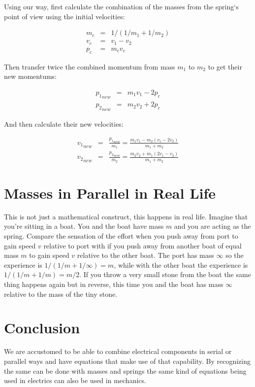 Using our way, first calculate the combination of the masses from the spring`s point of view using the initial velocities:

\begin{eqnarray}
m_c &=& 1/(1/m_1 + 1/m_2) \\
v_c &=& v_1 - v_2 \\
p_c &=& m_c v_c
\end{eqnarray}

Then transfer twice the combined momentum from mass $m_1$ to $m_2$ to get their new momentums:

\begin{eqnarray}
{p_1}_{new} &=& m_1 v_1 - 2 p_c \\
{p_2}_{new} &=& m_2 v_2 + 2 p_c
\end{eqnarray}

And then calculate their new velocities:

\begin{eqnarray}
{v_1}_{new} &=& \frac{{p_1}_{new}}{m_1} = \frac{m_1 v_1 - m_2(v_1 - 2 v_2)}{m_1 + m_2} \\
{v_2}_{new} &=& \frac{{p_2}_{new}}{m_2} = \frac{m_2 v_2 + m_1(2 v_1 - v_2)}{m_1 + m_2}
\end{eqnarray}

\section{Masses in Parallel in Real Life}

This is not just a mathematical construct, this happens in real life.
Imagine that you're sitting in a boat.
You and the boat have mass $m$ and you are acting as the spring.
Compare the sensation of the effort when you push away from port to gain speed $v$ relative to port with if you push away from another boat of equal mass $m$ to gain speed $v$ relative to the other boat.
The port has mass $\infty$ so the experience is $1/(1/m + 1/\infty) = m$, while with the other boat the experience is $1/(1/m + 1/m) = m/2$.
If you throw a very small stone from the boat the same thing happens again but in reverse, this time you and the boat has mass $\infty$ relative to the mass of the tiny stone.

\section{Conclusion}

We are accustomed to be able to combine electrical components in serial or parallel ways and have equations that make use of that capability.
By recognizing the same can be done with masses and springs the same kind of equations being used in electrics can also be used in mechanics.

